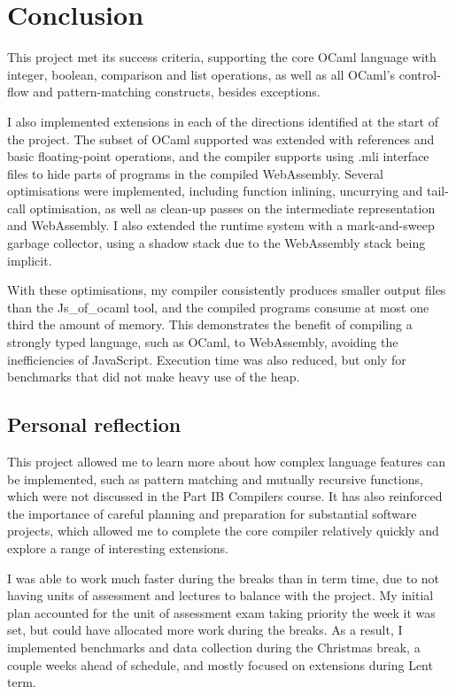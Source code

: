 \chapter{Conclusion}

This project met its success criteria, supporting the core OCaml language with integer, boolean, comparison and list operations, as well as all OCaml's control-flow and pattern-matching constructs, besides exceptions.

I also implemented extensions in each of the directions identified at the start of the project. The subset of OCaml supported was extended with references and basic floating-point operations, and the compiler supports using .mli interface files to hide parts of programs in the compiled WebAssembly.
Several optimisations were implemented, including function inlining, uncurrying and tail-call optimisation, as well as clean-up passes on the intermediate representation and WebAssembly.
I also extended the runtime system with a mark-and-sweep garbage collector, using a shadow stack due to the WebAssembly stack being implicit.%

With these optimisations, my compiler consistently produces smaller output files than the Js\_of\_ocaml tool, and the compiled programs consume at most one third the amount of memory. 
This demonstrates the benefit of compiling a strongly typed language, such as OCaml, to WebAssembly, avoiding the inefficiencies of JavaScript. Execution time was also reduced, but only for benchmarks that did not make heavy use of the heap.


\section{Personal reflection}
This project allowed me to learn more about how complex language features can be implemented, such as pattern matching and mutually recursive functions, which were not discussed in the Part IB Compilers course. It has also reinforced the importance of careful planning and preparation for substantial software projects, which allowed me to complete the core compiler relatively quickly and explore a range of interesting extensions. 

I was able to work much faster during the breaks than in term time, due to not having units of assessment and lectures to balance with the project. My initial plan accounted for the unit of assessment exam taking priority the week it was set, but could have allocated more work during the breaks. As a result, I implemented benchmarks and data collection during the Christmas break, a couple weeks ahead of schedule, and mostly focused on extensions during Lent term.



